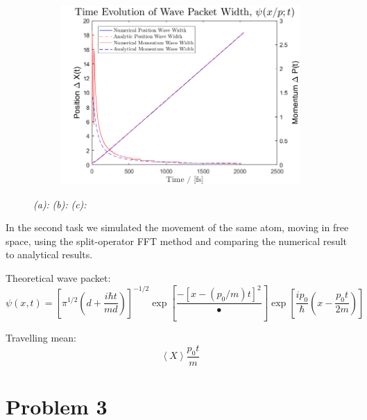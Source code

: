 \begin{figure}[H]
\begin{subfigure}[t]{0.7\textwidth}
\includegraphics[width=\textwidth]{graphics/Task2/width_evolution.png}
\caption{}
\label{fig:2_c}
\end{subfigure}

\caption{
	\textit{(a):}  
	\textit{(b):} 
	\textit{(c):} 
}
\label{fig:2}
\end{figure}

In the second task we simulated the movement of the same atom, moving in free space, using the split-operator FFT method and comparing the numerical result to analytical results.

Theoretical wave packet:
\begin{equation}
\psi(x,t) = \left[
\pi^{1/2}\left(
d+\frac{i\hbar t}{md}
\right)
\right]^{-1/2}
\exp\left[
\frac{-\left[x-\left(p_0/m\right)t\right]^2}{•}
\right]
\exp\left[
\frac{ip_0}{\hbar}\left(x-\frac{p_0t}{2m}\right)
\right]
\end{equation}

Travelling mean:
\begin{equation}
\left<X\right>\frac{p_0t}{m}
\end{equation}



\section*{Problem 3}

